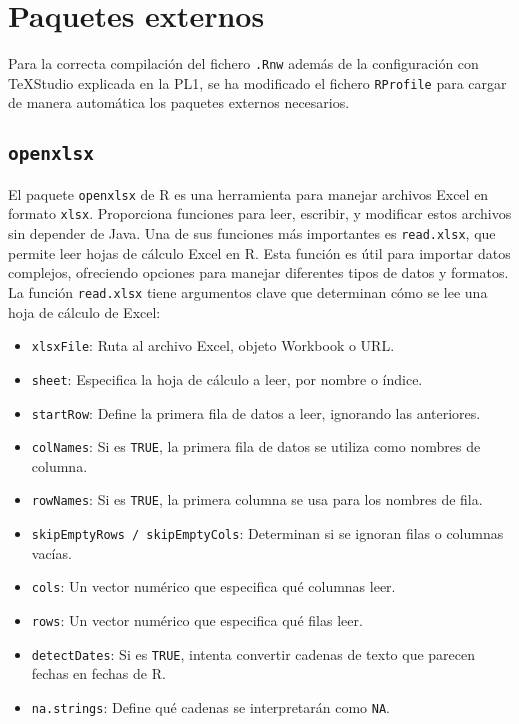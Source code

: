 \documentclass[12pt]{report}\usepackage[]{graphicx}\usepackage[dvipsnames]{xcolor}
\begin{document}
 	
 	\chapter{Paquetes externos}\label{ap:PaquetesExternos}
 	
 		Para la correcta compilación del fichero \texttt{.Rnw} además de la configuración con \TeX Studio explicada en la PL1, se ha modificado el fichero \texttt{RProfile} para cargar de manera automática los paquetes externos necesarios. 
 		
 		
 	
	 	\section{\texttt{openxlsx}}
	 	
		 	El paquete \texttt{openxlsx} de R es una herramienta para manejar archivos Excel en formato \texttt{xlsx}. Proporciona funciones para leer, escribir, y modificar estos archivos sin depender de Java. Una de sus funciones más importantes es \texttt{read.xlsx}, que permite leer hojas de cálculo Excel en R. Esta función es útil para importar datos complejos, ofreciendo opciones para manejar diferentes tipos de datos y formatos.\\
		 	
		 	La función \texttt{read.xlsx} tiene argumentos clave que determinan cómo se lee una hoja de cálculo de Excel:
		 	
		 	\begin{itemize}
		 		\item \texttt{xlsxFile}: Ruta al archivo Excel, objeto Workbook o URL.
		 		\item \texttt{sheet}: Especifica la hoja de cálculo a leer, por nombre o índice.
		 		\item \texttt{startRow}: Define la primera fila de datos a leer, ignorando las anteriores.
		 		\item \texttt{colNames}: Si es \texttt{TRUE}, la primera fila de datos se utiliza como nombres de columna.
		 		\item \texttt{rowNames}: Si es \texttt{TRUE}, la primera columna se usa para los nombres de fila.
		 		\item \texttt{skipEmptyRows / skipEmptyCols}: Determinan si se ignoran filas o columnas vacías.
		 		\item \texttt{cols}: Un vector numérico que especifica qué columnas leer.
		 		\item \texttt{rows}: Un vector numérico que especifica qué filas leer.
		 		\item \texttt{detectDates}: Si es \texttt{TRUE}, intenta convertir cadenas de texto que parecen fechas en fechas de R.
		 		\item \texttt{na.strings}: Define qué cadenas se interpretarán como \texttt{NA}.
		 	\end{itemize}
		 	
\end{document}
